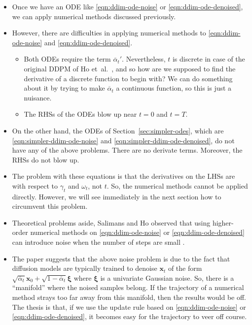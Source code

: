 \documentclass[10pt]{article}
\newcommand{\ve}[1]{\mathbf{#1}}
\newcommand{\ves}[1]{\boldsymbol{#1}}
\newcommand{\etal}{{et~al.}}
\newcommand{\ov}[1]{\overline{#1}}
\begin{document}
\begin{itemize}
  \item Once we have an ODE like \eqref{eqn:ddim-ode-noise} or \eqref{eqn:ddim-ode-denoised}, we can apply numerical methods discussed previously. 
  
  \item However, there are difficulties in applying numerical methods to \eqref{eqn:ddim-ode-noise} and \eqref{eqn:ddim-ode-denoised}.
  \begin{itemize}
    \item Both ODEs require the term $\ov{\alpha}_t'$. Nevertheless, $t$ is discrete in case of the original DDPM of Ho \etal~\cite{Ho:2020}, and so how are we supposed to find the derivative of a discrete function to begin with? We can do something about it by trying to make $\ov{\alpha}_t$ a continuous function, so this is just a nuisance.
    
    \item The RHSs of the ODEs blow up near $t=0$ and $t=T$. 
  \end{itemize}

  \item On the other hand, the ODEs of Section~\ref{sec:simpler-odes}, which are \eqref{eqn:simpler-ddim-ode-noise} and \eqref{eqn:simpler-ddim-ode-denoised}, do not have any of the above problems. There are no derivate terms. Moreover, the RHSs do not blow up. 
  
  \item The problem with these equations is that the derivatives on the LHSs are with respect to $\gamma_t$ and $\omega_t$, not $t$. So, the numerical methods cannot be applied directly. However, we will see immediately in the next section how to circumvent this problem.

  \item Theoretical problems aside, Salimans and Ho observed that using higher-order numerical methods on \eqref{eqn:ddim-ode-noise} or \eqref{eqn:ddim-ode-denoised} can introduce noise when the number of steps are small \cite{Salimans:2022}.
  
  \item The paper suggests that the above noise problem is due to the fact that diffusion models are typically trained to denoise $\ve{x}_t$ of the form $\sqrt{\ov{\alpha}_t}\ve{x}_0 + \sqrt{1 - \ov{\alpha}_t} \ves{\xi}$ where $\ves{\xi}$ is a univariate Gaussian noise. So, there is a ``manifold'' where the noised samples belong. If the trajectory of a numerical method strays too far away from this manifold, then the results would be off. The thesis is that, if we use the update rule based on \eqref{eqn:ddim-ode-noise} or \eqref{eqn:ddim-ode-denoised}, it becomes easy for the trajectory to veer off course.  
\end{itemize}
\end{document}
